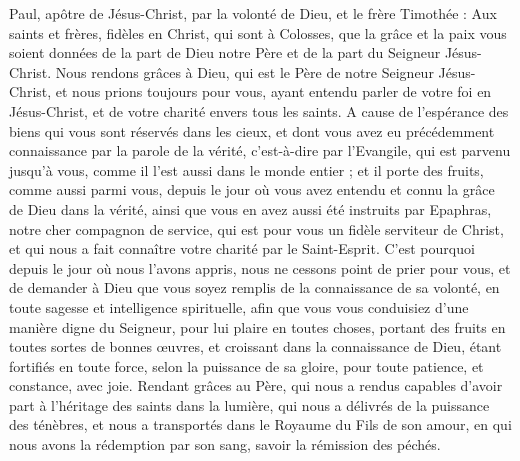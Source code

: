 \begin{multicols}{2}
\VerseOne{}Paul, apôtre de Jésus-Christ, par la volonté de Dieu, et le frère Timothée :
Aux saints et frères, fidèles en Christ, qui sont à Colosses, que la grâce et la paix vous soient données de la part de Dieu notre Père et de la part du Seigneur Jésus-Christ.
Nous rendons grâces à Dieu, qui est le Père de notre Seigneur Jésus-Christ, et nous prions toujours pour vous,
ayant entendu parler de votre foi en Jésus-Christ, et de votre charité envers tous les saints.
A cause de l'espérance des biens qui vous sont réservés dans les cieux, et dont vous avez eu précédemment connaissance par la parole de la vérité, c'est-à-dire par l'Evangile,
qui est parvenu jusqu'à vous, comme il l'est aussi dans le monde entier ; et il porte des fruits, comme aussi parmi vous, depuis le jour où vous avez entendu et connu la grâce de Dieu dans la vérité,
ainsi que vous en avez aussi été instruits par Epaphras, notre cher compagnon de service, qui est pour vous un fidèle serviteur de Christ,
et qui nous a fait connaître votre charité par le Saint-Esprit.
C'est pourquoi depuis le jour où nous l'avons appris, nous ne cessons point de prier pour vous, et de demander à Dieu que vous soyez remplis de la connaissance de sa volonté, en toute sagesse et intelligence spirituelle,
afin que vous vous conduisiez d'une manière digne du Seigneur, pour lui plaire en toutes choses, portant des fruits en toutes sortes de bonnes œuvres, et croissant dans la connaissance de Dieu,
étant fortifiés en toute force, selon la puissance de sa gloire, pour toute patience, et constance, avec joie.
Rendant grâces au Père, qui nous a rendus capables d'avoir part à l'héritage des saints dans la lumière,
qui nous a délivrés de la puissance des ténèbres, et nous a transportés dans le Royaume du Fils de son amour,
en qui nous avons la rédemption par son sang, savoir la rémission des péchés.

\end{multicols}
